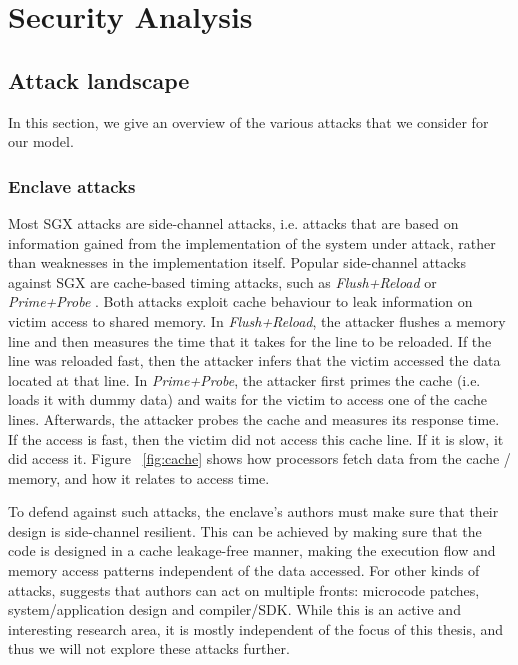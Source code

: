\chapter{Security Analysis}\label{chap:security_analysis}

\section{Attack landscape}

In this section, we give an overview of the various attacks that we consider for our model.

\subsection{Enclave attacks}

Most SGX attacks are side-channel \cite{sgx_survey} attacks, i.e. attacks that are based on information gained from the implementation of the system under attack, rather than weaknesses in the implementation itself. Popular side-channel attacks against SGX are cache-based timing attacks, such as \textit{Flush+Reload} \cite{flush_reload} or \textit{Prime+Probe} \cite{prime_probe}. Both attacks exploit cache behaviour to leak information on victim access to shared memory. In \textit{Flush+Reload}, the attacker flushes a memory line and then measures the time that it takes for the line to be reloaded. If the line was reloaded fast, then the attacker infers that the victim accessed the data located at that line. In \textit{Prime+Probe}, the attacker first primes the cache (i.e. loads it with dummy data) and waits for the victim to access one of the cache lines. Afterwards, the attacker probes the cache and measures its response time. If the access is fast, then the victim did not access this cache line. If it is slow, it did access it. Figure ~\ref{fig:cache} shows how processors fetch data from the cache / memory, and how it relates to access time.

To defend against such attacks, the enclave's authors must make sure that their design is side-channel resilient. This can be achieved by making sure that the code is designed in a cache leakage-free manner, making the execution flow and memory access patterns independent of the data accessed. For other kinds of attacks, \cite{sgx_survey} suggests that authors can act on multiple fronts: microcode patches, system/application design and compiler/SDK. While this is an active and interesting research area, it is mostly independent of the focus of this thesis, and thus we will not explore these attacks further.

